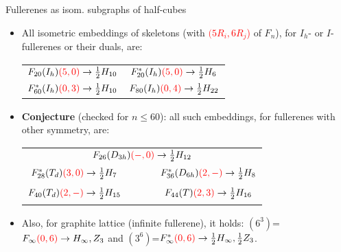 \documentclass[%
pdf,
colorBG,
slideColor,
]{prosper}
\begin{document}
\begin{slide}{Fullerenes as isom. subgraphs of half-cubes}
\begin{itemize}
\item All isometric embeddings of skeletons 
(with \textcolor{red}{$(5R_i,6R_j$)}
of $F_n$), for $I_h$- 
or $I$-fullerenes or their duals, are:
\begin{center}
\begin{tabular}{cc}
$F_{20}(I_h)\textcolor{red}{(5,0)}  \to \frac{1}{2}H_{10}$ & 
$F_{20}^{*}(I_h)\textcolor{red}{(5,0)}  \to \frac{1}{2}H_{6}$\\
$F_{60}^{*}(I_h)\textcolor{red}{(0,3)}  \to \frac{1}{2}H_{10}$ & 
$F_{80}(I_h)\textcolor{red}{(0,4)}  \to 
\frac{1}{2}H_{22}$ 
\end{tabular}
\end{center}

\item {\bf Conjecture} (checked for $n \le 60$): all
such embeddings, for fullerenes with other symmetry, are:
 
\begin{center}
\begin{tabular}{ccc}
\multicolumn{3}{c}{$F_{26}(D_{3h})\textcolor{red}{(-,0)}  \to 
\frac{1}{2}H_{12}$}\\
$F_{28}^{*}(T_d)\textcolor{red}{(3,0)}  \to \frac{1}{2}H_{7}$& 
\mbox{~~~}&$F_{36}^{*}(D_{6h})\textcolor{red}{(2,-)}  \to 
\frac{1}{2}H_{8}$\\
$F_{40}(T_d)\textcolor{red}{(2,-)}  \to \frac{1}{2}H_{15}$& 
\mbox{~~~}&$F_{44}(T)\textcolor{red}{(2,3)}  \to \frac{1}{2}H_{16}$
\end{tabular}
\end{center}
\item Also, for graphite lattice (infinite fullerene), it holds:
$(6^3)$=$F_{\infty}\textcolor{red}{(0,6)} \to H_{\infty},Z_{3}$ and 
$(3^6)$=$F_{\infty}^{*}\textcolor{red}{(0,6)} \to \frac{1}{2}H_{\infty},
\frac{1}{2}Z_{3}$.
\end{itemize}

\end{slide}
\end{document}
